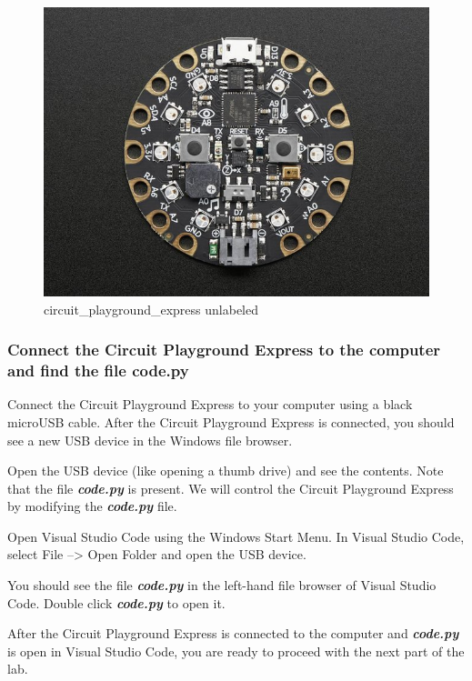 \documentclass[11pt]{article}
\makeatletter
\def\maxwidth{\ifdim\Gin@nat@width>\linewidth\linewidth
    \else\Gin@nat@width\fi}
\let\Oldincludegraphics\includegraphics
\renewcommand{\includegraphics}[1]{\Oldincludegraphics[width=.8\maxwidth]{#1}}
\makeatother
\begin{document}
\begin{figure}
\centering
\includegraphics{images/circuit_playground_cpx03.jpg}
\caption{circuit\_playground\_express unlabeled}
\end{figure}

    \hypertarget{connect-the-circuit-playground-express-to-the-computer-and-find-the-file-code.py}{%
\subsubsection{Connect the Circuit Playground Express to the computer
and find the file
code.py}\label{connect-the-circuit-playground-express-to-the-computer-and-find-the-file-code.py}}

Connect the Circuit Playground Express to your computer using a black
microUSB cable. After the Circuit Playground Express is connected, you
should see a new USB device in the Windows file browser.

Open the USB device (like opening a thumb drive) and see the contents.
Note that the file \textbf{\emph{code.py}} is present. We will control
the Circuit Playground Express by modifying the \textbf{\emph{code.py}}
file.

Open Visual Studio Code using the Windows Start Menu. In Visual Studio
Code, select File --\textgreater{} Open Folder and open the USB device.

You should see the file \textbf{\emph{code.py}} in the left-hand file
browser of Visual Studio Code. Double click \textbf{\emph{code.py}} to
open it.

After the Circuit Playground Express is connected to the computer and
\textbf{\emph{code.py}} is open in Visual Studio Code, you are ready to
proceed with the next part of the lab.
\end{document}
